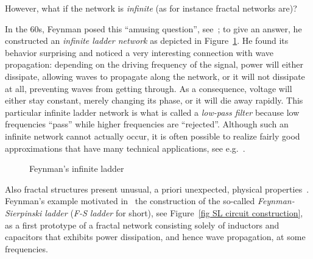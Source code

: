 \documentclass[11pt]{amsart}
\theoremstyle{definition}
\theoremstyle{remark}
\theoremstyle{example}
\numberwithin{equation}{section}
\begin{document}
However, what if the network is \textit{infinite} (as for instance fractal networks are)?

\medskip

In the 60s, Feynman posed this ``amusing question'', see~\cite[Section 22.6]{FLS64}; to give an answer, he constructed an \textit{infinite ladder network} as depicted in Figure~\ref{fig IL}. He found its behavior surprising and noticed a very interesting connection with wave propagation: 
depending on the driving frequency of the signal, power will either dissipate, allowing waves to propagate along the network, or it will not dissipate at all, preventing waves from getting through. As a consequence, voltage will either stay constant, merely changing its phase, or it will die away rapidly.
This particular infinite ladder network is what is called a \textit{low-pass filter} because low frequencies ``pass'' while higher frequencies are ``rejected''. Although such an infinite network cannot actually occur, it is often possible to realize fairly good approximations that have many technical applications, see e.g.~\cite[Section 22.7]{FLS64}.

\begin{figure}[H]
\centering
{}
\caption{Feynman's infinite ladder}
\label{fig IL}
\end{figure}

Also fractal structures present unusual, a priori unexpected, physical properties~\cite{ABD+12,ADL14}. Feynman's example motivated in~\cite{A++16} the construction of the so-called \textit{Feynman-Sierpinski ladder} (\textit{F-S ladder} for short), see Figure~\ref{fig SL circuit construction}, as a first prototype of a fractal network consisting solely of inductors and capacitors that exhibits power dissipation, and hence wave propagation, at some frequencies.
\end{document}
